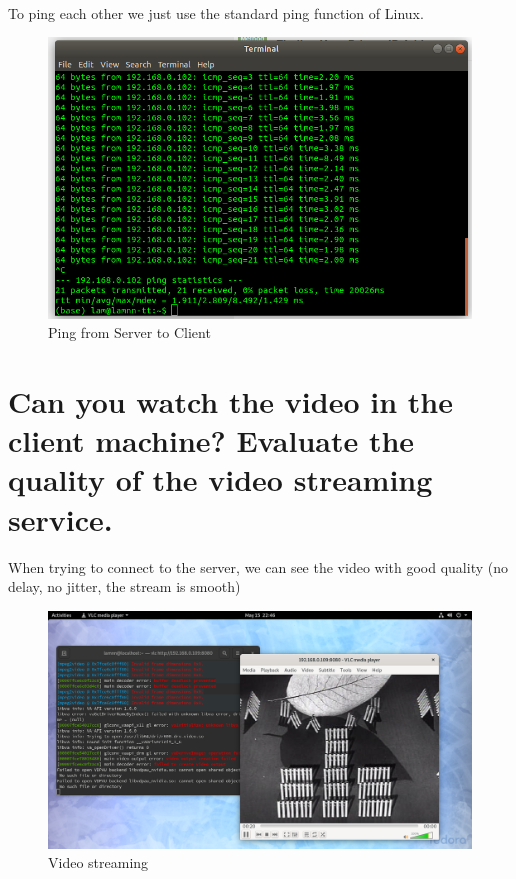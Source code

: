 \documentclass[11pt,a4paper]{report}
\begin{document}
	\\
	To ping each other we just use the standard ping function of Linux.
	\begin{figure}[h!]
  		\includegraphics[width=\linewidth]{ping-to-client.png}
  		\caption{Ping from Server to Client}
  		\label{fig:ping}
	\end{figure}
	
	\section{Can you watch the video in the client machine? Evaluate the quality of the video streaming service.}
	When trying to connect to the server, we can see the video with good quality (no delay, no jitter, the stream is smooth)
	\begin{figure}[h!]
  		\includegraphics[width=\linewidth]{vid-perfect-cond.png}
  		\caption{Video streaming}
  		\label{fig:vid-p-cond}
	\end{figure}
	
\end{document}
